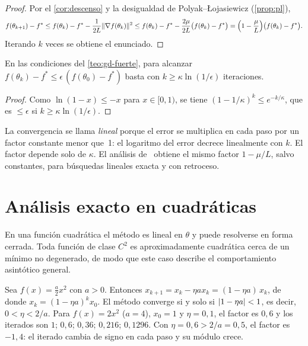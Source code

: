 \begin{proof}
Por el \cref{cor:descenso} y la desigualdad de Polyak--Łojasiewicz (\cref{prop:pl}),
\[
f(\theta_{k+1})-f^{\ast}\le f(\theta_k)-f^{\ast}-\frac{1}{2L}\lVert\nabla f(\theta_k)\rVert^{2}\le f(\theta_k)-f^{\ast}-\frac{2\mu}{2L}\bigl(f(\theta_k)-f^{\ast}\bigr)=\Bigl(1-\frac{\mu}{L}\Bigr)\bigl(f(\theta_k)-f^{\ast}\bigr).
\]
Iterando $k$ veces se obtiene el enunciado.
\end{proof}

\begin{corolario}\label{cor:iteraciones}
En las condiciones del \cref{teo:gd-fuerte}, para alcanzar $f(\theta_k)-f^{\ast}\le\epsilon\,(f(\theta_0)-f^{\ast})$ basta con $k\ge\kappa\ln(1/\epsilon)$ iteraciones.
\end{corolario}

\begin{proof}
Como $\ln(1-x)\le -x$ para $x\in[0,1)$, se tiene $(1-1/\kappa)^{k}\le e^{-k/\kappa}$, que es $\le\epsilon$ si $k\ge\kappa\ln(1/\epsilon)$.
\end{proof}

La convergencia se llama \emph{lineal} porque el error se multiplica en cada paso por un factor constante menor que~1: el logaritmo del error decrece linealmente con $k$. El factor depende solo de $\kappa$. El análisis de~\cite[§9.3]{bv} obtiene el mismo factor $1-\mu/L$, salvo constantes, para búsquedas lineales exacta y con retroceso.

\section{Análisis exacto en cuadráticas}

En una función cuadrática el método es lineal en $\theta$ y puede resolverse en forma cerrada. Toda función de clase $C^{2}$ es aproximadamente cuadrática cerca de un mínimo no degenerado, de modo que este caso describe el comportamiento asintótico general.

\begin{ejemplo}\label{ej:gd-1d}
Sea $f(x)=\frac{a}{2}x^{2}$ con $a>0$. Entonces $x_{k+1}=x_k-\eta a x_k=(1-\eta a)\,x_k$, de donde $x_k=(1-\eta a)^{k}x_0$. El método converge si y solo si $\lvert1-\eta a\rvert<1$, es decir, $0<\eta<2/a$. Para $f(x)=2x^{2}$ ($a=4$), $x_0=1$ y $\eta=0{,}1$, el factor es $0{,}6$ y los iterados son $1$; $0{,}6$; $0{,}36$; $0{,}216$; $0{,}1296$. Con $\eta=0{,}6>2/a=0{,}5$, el factor es $-1{,}4$: el iterado cambia de signo en cada paso y su módulo crece.
\end{ejemplo}

